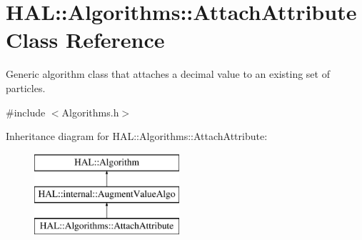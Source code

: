 \hypertarget{class_h_a_l_1_1_algorithms_1_1_attach_attribute}{\section{H\+A\+L\+:\+:Algorithms\+:\+:Attach\+Attribute Class Reference}
\label{class_h_a_l_1_1_algorithms_1_1_attach_attribute}
}


Generic algorithm class that attaches a decimal value to an existing set of particles.  




{\ttfamily \#include $<$Algorithms.\+h$>$}

Inheritance diagram for H\+A\+L\+:\+:Algorithms\+:\+:Attach\+Attribute\+:\begin{figure}[H]
\begin{center}
\leavevmode
\includegraphics[height=3.000000cm]{class_h_a_l_1_1_algorithms_1_1_attach_attribute}
\end{center}
\end{figure}
